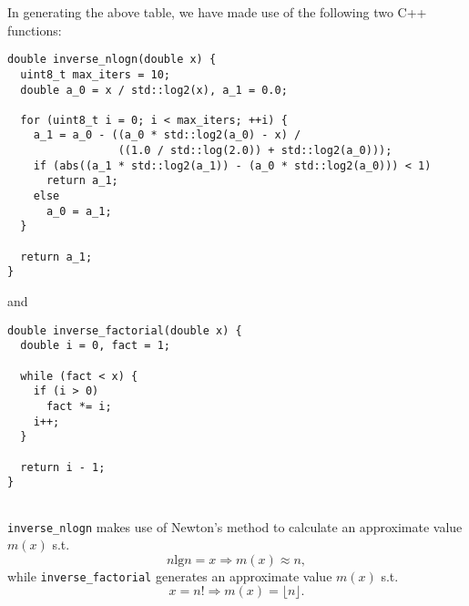 \qquad In generating the above table, we have made use of the following two C++ functions:
\begin{verbatim}
double inverse_nlogn(double x) {
  uint8_t max_iters = 10;
  double a_0 = x / std::log2(x), a_1 = 0.0;

  for (uint8_t i = 0; i < max_iters; ++i) {
    a_1 = a_0 - ((a_0 * std::log2(a_0) - x) /
                 ((1.0 / std::log(2.0)) + std::log2(a_0)));
    if (abs((a_1 * std::log2(a_1)) - (a_0 * std::log2(a_0))) < 1)
      return a_1;
    else
      a_0 = a_1;
  }

  return a_1;
}
\end{verbatim}
and 
\begin{verbatim}
double inverse_factorial(double x) {
  double i = 0, fact = 1;

  while (fact < x) {
    if (i > 0)
      fact *= i;
    i++;
  }

  return i - 1;
}
    
\end{verbatim}
\texttt{inverse\_nlogn} makes use of Newton's method to calculate an approximate 
value $m(x)$ s.t. 
\[
    n\text{lg}n = x \Rightarrow m(x) \approx n, 
\]
while \texttt{inverse\_factorial} generates an approximate value $m(x)$ s.t. 
\[
    x = n! \Rightarrow m(x) = \lfloor n \rfloor. 
\]
